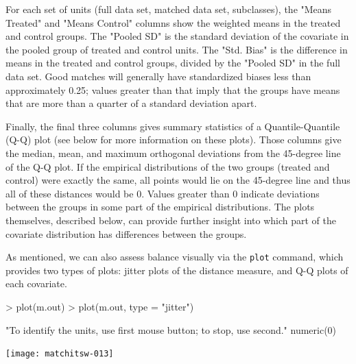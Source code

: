 \documentclass[oneside,letterpaper,titlepage]{article}
\begin{document}
\begin{enumerate}
For each set of units (full data set, matched data set, subclasses), the "Means Treated" and "Means Control" columns show the weighted
means in the treated and control groups.  The "Pooled SD" is the standard deviation of the covariate in the pooled group of treated and
control units.  The "Std. Bias" is the difference in means in the treated and control groups, divided by the "Pooled SD" in the full data
set.  Good matches will generally have standardized biases less than approximately 0.25; values greater than that imply that the
groups have means that are more than a quarter of a standard deviation apart.  

Finally, the final three columns 
gives summary statistics of a Quantile-Quantile (Q-Q) plot (see below for more information on these plots).
Those columns give the median, mean, and maximum orthogonal deviations from the 45-degree line of the Q-Q plot.  If the empirical distributions
of the two groups (treated and control) were exactly the same, all points would lie on the 45-degree line and thus all of these distances
would be 0.  Values greater than 0 indicate deviations between the groups in some part of the empirical distributions.  The plots themselves,
described below, can provide further insight into which part of the covariate distribution has differences between the groups.

As mentioned, we can also assess balance visually via the \texttt{plot} command, which provides two types of plots: jitter plots of
the distance measure, and Q-Q plots of each covariate.


\begin{Schunk}
\begin{Sinput}
> plot(m.out)
> plot(m.out, type = "jitter")
\end{Sinput}
\begin{Soutput}
[1] "To identify the units, use first mouse button; to stop, use second."
numeric(0)
\end{Soutput}
\end{Schunk}
\texttt{[image: matchitsw-013]}


\end{enumerate}
\end{document}

